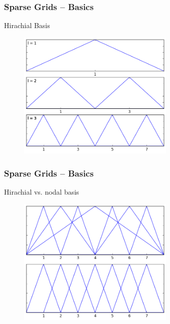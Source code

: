\begin{frame}
  \frametitle{Sparse Grids -- Basics}
  \topline
  \vspace{-10px}
  \begin{block}{Hirachial Basis}
    \begin{figure}[!htp]
      \centering
      \includegraphics[width=7.5cm]{images/sparse_hats}
      \vspace{-12px}
      \caption{}
    \end{figure}
  \end{block}
\end{frame}

\begin{frame}
  \frametitle{Sparse Grids -- Basics}
  \topline
  \vspace{-10px}
  \begin{block}{Hirachial vs. nodal  basis}
    \begin{figure}[!htp]
      \centering
      \includegraphics[width=7.5cm]{images/sparse_together}
      \vspace{-12px}
      \caption{}
    \end{figure}
  \end{block}
\end{frame}

